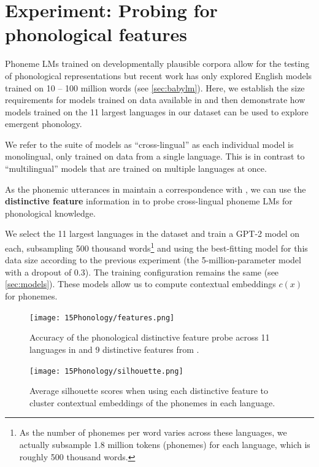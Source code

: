 \section{Experiment: Probing for phonological features}\label{sec:featureprobing}

Phoneme LMs trained on developmentally plausible corpora allow for the testing of phonological representations but recent work has only explored English models trained on 10 -- 100 million words (see \cref{sec:babylm}). Here, we establish the size requirements for models trained on data available in \ipachildes and then demonstrate how models trained on the 11 largest languages in our dataset can be used to explore emergent phonology.

We refer to the suite of models as ``cross-lingual'' as each individual model is monolingual, only trained on data from a single language. This is in contrast to ``multilingual'' models that are trained on multiple languages at once.

As the phonemic utterances in \ipachildes maintain a correspondence with \phoible, we can use the \textbf{distinctive feature} information in \phoible to probe cross-lingual phoneme LMs for phonological knowledge. 

We select the 11 largest languages in the dataset and train a GPT-2 model on each, subsampling 500 thousand words\footnote{As the number of phonemes per word varies across these languages, we actually subsample 1.8 million tokens (phonemes) for each language, which is roughly 500 thousand words.} and using the best-fitting model for this data size according to the previous experiment (the 5-million-parameter model with a dropout of 0.3). The training configuration remains the same (see \cref{sec:models}). These models allow us to compute contextual embeddings $c(x)$ for phonemes.

\begin{figure}[t]
    \centering
    \texttt{[image: 15Phonology/features.png]}
    \caption{Accuracy of the phonological distinctive feature probe across 11 languages in \ipachildes and 9 distinctive features from \phoible.}
    \label{fig:features}
\end{figure}

\begin{figure}[t]
    \centering
    \texttt{[image: 15Phonology/silhouette.png]}
    \caption{Average silhouette scores when using each distinctive feature to cluster contextual embeddings of the phonemes in each language.}
    \label{fig:silhouette}
\end{figure}

